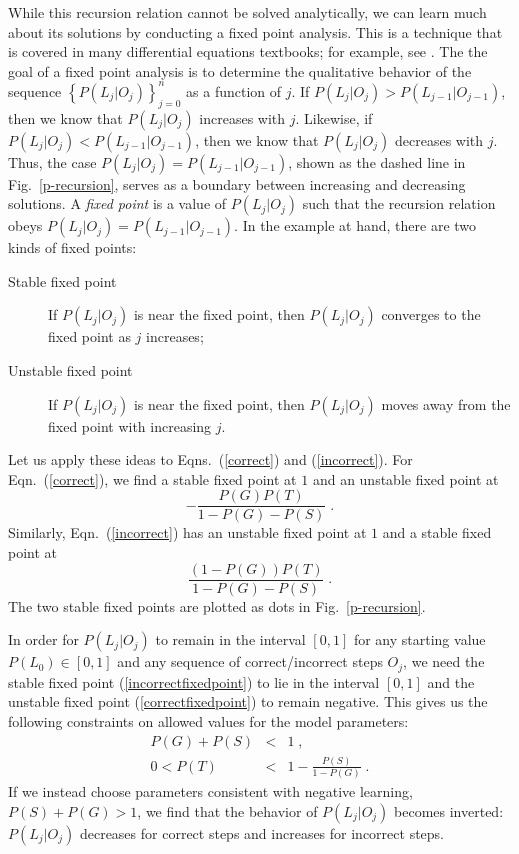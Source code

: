 \documentclass{acmlarge-edm}
\begin{document}
While this recursion relation cannot be solved analytically, we can learn
much about its solutions by conducting a fixed point analysis. 
This is a technique that is covered in many differential equations textbooks; for
example, see \cite{blanchard_differential_2006}.  The the goal of a
fixed point  analysis is to determine the qualitative behavior of the sequence
$\left\{P(L_j|O_j)\right\}_{j=0}^n$ as a
function of $j$.  If $P(L_j|O_j)>P(L_{j-1}|O_{j-1})$, then we know
that $P(L_j|O_j)$
increases with $j$.  Likewise, if $P(L_j|O_j)<P(L_{j-1}|O_{j-1})$,
then we know that $P(L_j|O_j)$ decreases with $j$.  Thus, the case
$P(L_j|O_j)=P(L_{j-1}|O_{j-1})$, shown as the dashed line in Fig.~\ref{p-recursion}, 
serves as a boundary between increasing and decreasing solutions.
A {\em fixed point} is a value of $P(L_j|O_j)$ such that the recursion
relation obeys $P(L_j|O_j)=P(L_{j-1}|O_{j-1})$.  In the example at
hand, there are two kinds of fixed points:
\begin{description}
  \item[Stable fixed point] If $P(L_j|O_j)$ is near the fixed point,
    then $P(L_j|O_j)$ converges to the fixed point as $j$ increases; 
  \item[Unstable fixed point]  If $P(L_j|O_j)$ is near the fixed
    point, then $P(L_j|O_j)$ moves away from the fixed point with
    increasing $j$. 
\end{description}

Let us apply these ideas to Eqns.~(\ref{correct}) and (\ref{incorrect}).
For Eqn.~(\ref{correct}), we find a stable fixed point at $1$ and 
an unstable fixed point at
%
\begin{equation}
    - \frac{P(G) P(T)}{1-P(G)-P(S)} \; .
      \label{correctfixedpoint}
\end{equation}
%
Similarly, Eqn.~(\ref{incorrect}) has an unstable fixed point at $1$
and a stable fixed point at
%
\begin{equation}
    \frac{\left(1-P(G)\right) P(T)}{1-P(G)-P(S)} \; . 
       \label{incorrectfixedpoint}
\end{equation}
%
The two stable fixed points are plotted as dots in Fig.~\ref{p-recursion}.


In order for $P(L_j|O_j)$ to remain in the interval $\left[0,1\right]$ 
for any starting value $P(L_0)\in \left[0,1\right]$ and any sequence of 
correct/incorrect steps $O_j$, 
we need the stable fixed point (\ref{incorrectfixedpoint})
to lie in the interval $\left[0,1\right]$ and the unstable fixed point 
(\ref{correctfixedpoint}) to remain negative.  This gives us the following
constraints on allowed values for the model parameters:
%
\begin{eqnarray}
        P(G)+P(S)&<& 1 \;, \label{littleconstraint}\\
        0 < P(T) &<& 1-\frac{P(S)}{1-P(G)}  \; .
        \label{bigconstraint}
\end{eqnarray}
%
If we instead choose parameters consistent with negative learning,
$P(S)+P(G)>1$, we find that the behavior of $P(L_j|O_j)$ becomes inverted: 
$P(L_j|O_j)$ decreases for correct steps and increases for incorrect steps.
\end{document}
